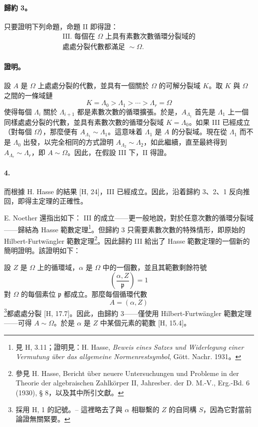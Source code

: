 \documentclass[11pt]{article}
\begin{document}
\paragraph{歸約 3。}
只要證明下列命題，命題 II 即得證：
\[
\begin{gathered}\text{III. 每個在 }\Omega\text{ 上具有素數次數循環分裂域的}\\\text{處處分裂代數都滿足 }\sim\Omega .\end{gathered}
\]

\paragraph{證明。}
設 \(A\) 是 \(\Omega\) 上處處分裂的代數，並具有一個關於 \(\Omega\) 的可解分裂域 \(K\)。取 \(K\) 與 \(\Omega\) 之間的一條域鏈
\[
K=\Lambda_0>\Lambda_1>\cdots>\Lambda_r=\Omega
\]
使得每個 \(\Lambda_i\) 關於 \(\Lambda_{i+1}\) 都是素數次數的循環擴張。於是，\(A_{\Lambda_1}\) 首先是 \(\Lambda_1\) 上一個同樣處處分裂的代數，並具有素數次數的循環分裂域 \(K=\Lambda_0\)。如果 III 已經成立（對每個 \(\Omega\)），那麼便有 \(A_{\Lambda_1}\sim \Lambda_1\)。這意味着 \(\Lambda_1\) 是 \(A\) 的分裂域。現在從 \(\Lambda_1\) 而不是 \(\Lambda_0\) 出發，以完全相同的方式證明 \(A_{\Lambda_2}\sim\Lambda_2\)，如此繼續，直至最終得到 \(A_{\Lambda_r}\sim\Lambda_r\)，即 \(A\sim\Omega\)。因此，在假設 III 下，II 得證。

\paragraph{4.}
而根據 H. Hasse 的結果 [H, 24]，III 已經成立。因此，沿着歸約 3、2、1 反向推回，即得主定理的正確性。

E. Noether 還指出如下：
III 的成立——更一般地說，對於任意次數的循環分裂域——歸結為 Hasse 範數定理\footnote{\label{fn:p38-hasse-normensatz}見 H, 3.11；證明見：H. Hasse, \emph{Beweis eines Satzes und Widerlegung einer Vermutung über das allgemeine Normenrestsymbol}, Gött. Nachr. 1931。}。但歸約 3 只需要素數次數的特殊情形，即原始的 Hilbert-Furtwängler 範數定理\footnote{參見 H. Hasse, Bericht über neuere Untersuchungen und Probleme in der Theorie der algebraischen Zahlkörper II, Jahresber. der D. M.-V., Erg.-Bd. 6 (1930), § 8，以及其中所引文獻。}。因此歸約 III 給出了 Hasse 範數定理的一個新的簡明證明。該證明如下：

設 \(Z\) 是 \(\Omega\) 上的循環域，\(\alpha\) 是 \(\Omega\) 中的一個數，並且其範數剩餘符號
\[
\left(\frac{\alpha,Z}{\mathfrak p}\right)=1
\]
對 \(\Omega\) 的每個素位 \(\mathfrak p\) 都成立。那麼每個循環代數
\[
A=(\alpha,Z)
\]
\footnote{\label{fn:p38-hasse-notation}採用 H, 1 的記號。-- 這裡略去了與 \(\alpha\) 相聯繫的 \(Z\) 的自同構 \(S\)，因為它對當前論證無關緊要。}都處處分裂 [H, 17.7]。因此，由歸約 3——僅使用 Hilbert-Furtwängler 範數定理——可得 \(A\sim\Omega\)。於是 \(\alpha\) 是 \(Z\) 中某個元素的範數 [H, 15.4]。
\end{document}
